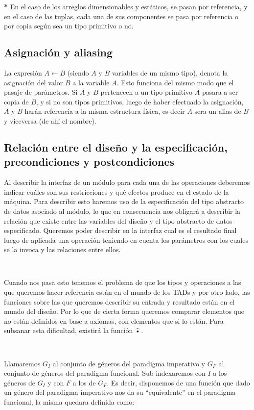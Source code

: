 \textbf{*} En el caso de los arreglos dimensionables y est\'aticos, se pasan por referencia, y en el caso de las tuplas, cada una de sus componentes se pasa por referencia o por copia seg\'un sea un tipo primitivo o no.

\subsection{Asignaci\'on y aliasing}

La expresi\'on $A \gets B$ (siendo $A$ y $B$ variables de un mismo tipo), denota la asignaci\'on del valor $B$ a la variable $A$. Esto funciona del mismo modo que el pasaje de par\'ametros. Si $A$ y $B$ pertenecen a un tipo primitivo $A$ pasara a ser copia de $B$, y si no son tipos primitivos, luego de haber efectuado la asignaci\'on, $A$ y $B$ har\'an referencia a la misma estructura f\'isica, es decir $A$ sera un alias de $B$ y viceversa (de ah\'i el nombre).

\subsection{Relaci\'on entre el dise\~no y la especificaci\'on, precondiciones y postcondiciones}

Al describir la interfaz de un m\'odulo para cada una de las operaciones deberemos indicar cu\'ales son sus restricciones y qu\'e efectos produce en el estado de la m\'aquina. Para describir esto haremos uso de la especificaci\'on del tipo abstracto de datos asociado al m\'odulo, lo que en consecuencia nos obligar\'a a describir la relaci\'on que existe entre las variables del dise\~no y el tipo abstracto de datos especificado. Queremos poder describir en la interfaz cual es el resultado final luego de aplicada una operaci\'on teniendo en cuenta los par\'ametros con los cuales se la invoca y las relaciones entre ellos.

~

Cuando nos pasa esto tenemos el problema de que los tipos y operaciones a las que queremos hacer referencia est\'an en el mundo de los TADs y por otro lado, las funciones sobre las que queremos describir su entrada y resultado est\'an en el mundo del dise\~no. Por lo que de cierta forma queremos comparar elementos que no est\'an definidos en base a axiomas, con elementos que si lo est\'an. Para subsanar esta dificultad, existir\'a la funci\'on $\widehat{\text{\textbullet}}$.

~

Llamaremos $G_I$ al conjunto de g\'eneros del paradigma imperativo y $G_F$ al conjunto de g\'eneros del paradigma funcional. Sub-indexaremos con $I$ a los g\'eneros de $G_I$ y con $F$ a los de $G_F$. Es decir, disponemos de una funci\'on que dado un g\'enero del paradigma imperativo nos da su ``equivalente'' en el paradigma funcional, la misma quedara definida como:

